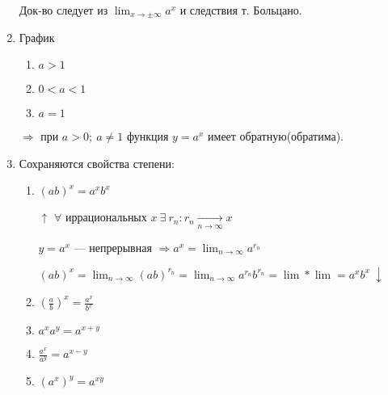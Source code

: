 \documentclass{article}
\begin{document}
\begin{enumerate}
        Док-во следует из \(\lim_{x \to \pm \infty} a^x\) и следствия т. Больцано.

        \item График
        \begin{enumerate}
            \item \( a > 1 \) %
            \item \( 0 < a < 1 \) %
            \item \( a = 1 \) %
        \end{enumerate}

        \( \Rightarrow \) при \(a > 0;\ a \neq 1\) функция \(y = a^x\) имеет обратную(обратима).

        \item Сохраняются свойства степени:
        \begin{enumerate}
            \item \( (ab)^x = a^x b^x \)
            
            \(\uparrow\) \( \forall \) иррациональных \(x\ \exists\ r_n: r_n \xrightarrow[n \to \infty]{} x \)

            \( y = a^x \) --- непрерывная \(\Rightarrow a^x = \lim_{n \to \infty} a^{r_n}\)

            \( (ab)^x = \lim_{n \to \infty}(ab)^{r_n} = \lim_{n \to \infty}a^{r_n} b^{r_n} = \lim*\lim = a^x b^x\ \downarrow \)

            \item \((\frac{a}{b})^x = \frac{a^x}{b^x}\)
            \item \( a^x a^y = a^{x + y} \)
            \item \( \frac{a^x}{a^y} = a^{x - y} \)
            \item \( (a^x)^y = a^{xy} \)
        \end{enumerate}    
    \end{enumerate}
\end{document}
